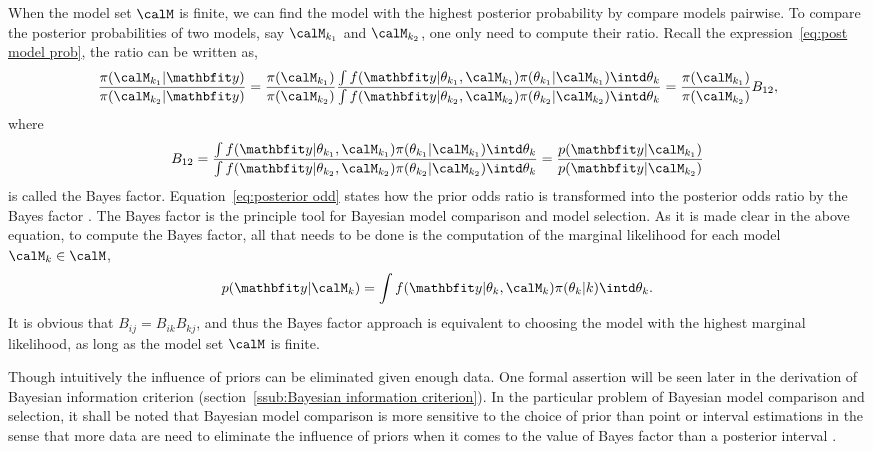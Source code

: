 When the model set $\calM$ is finite, we can find the model with the highest
posterior probability by compare models pairwise. To compare the posterior
probabilities of two models, say $\calM_{k_1}$ and $\calM_{k_2}$, one only
need to compute their ratio. Recall the expression~\eqref{eq:post model prob},
the ratio can be written as,
\begin{equation}
  \frac{\pi(\calM_{k_1}|\data)}{\pi(\calM_{k_2}|\data)}
  = \frac{\pi(\calM_{k_1})}{\pi(\calM_{k_2})} \frac
  {\int f(\data|\theta_{k_1},\calM_{k_1})\pi(\theta_{k_1}|\calM_{k_1})
      \intd\theta_k}
  {\int f(\data|\theta_{k_2},\calM_{k_2})\pi(\theta_{k_2}|\calM_{k_2})
      \intd\theta_k}
  = \frac{\pi(\calM_{k_1})}{\pi(\calM_{k_2})}B_{12},
  \label{eq:posterior odd}
\end{equation}
where
\begin{equation}
  B_{12} = \frac
  {\int f(\data|\theta_{k_1},\calM_{k_1})\pi(\theta_{k_1}|\calM_{k_1})
      \intd\theta_k}
  {\int f(\data|\theta_{k_2},\calM_{k_2})\pi(\theta_{k_2}|\calM_{k_2})
      \intd\theta_k}
    = \frac{p(\data|\calM_{k_1})}{p(\data|\calM_{k_2})}
  \label{eq:bayes factor}
\end{equation}
is called the Bayes factor. Equation~\eqref{eq:posterior odd} states how the
prior odds ratio is transformed into the posterior odds ratio by the Bayes
factor \cite{Kass:1995vb}. The Bayes factor is the principle tool for
Bayesian model comparison and model selection. As it is made clear in the
above equation, to compute the Bayes factor, all that needs to be done is the
computation of the marginal likelihood for each model $\calM_k\in\calM$,
\begin{equation}
  p(\data|\calM_k) =
  \int f(\data|\theta_k,\calM_k)\pi(\theta_k|k)\intd\theta_k.
\end{equation}
It is obvious that $B_{ij} = B_{ik} B_{kj}$, and thus the Bayes
factor approach is equivalent to choosing the model with the highest marginal
likelihood, as long as the model set $\calM$ is finite.

Though intuitively the influence of priors can be eliminated given enough
data. One formal assertion will be seen later in the derivation of Bayesian
information criterion (section~\ref{ssub:Bayesian information criterion}). In
the particular problem of Bayesian model comparison and selection, it shall be
noted that Bayesian model comparison is more sensitive to the choice of prior
than point or interval estimations in the sense that more data are need to
eliminate the influence of priors when it comes to the value of Bayes factor
than a posterior interval \cite{Kass:1993vy, Kass:1995vb}.

